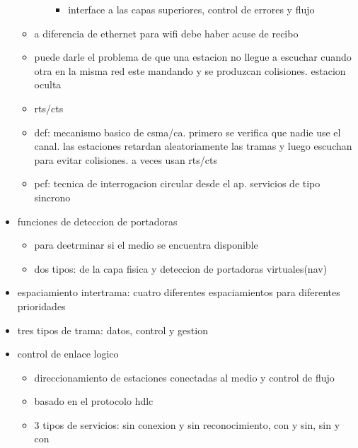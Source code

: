 \documentclass[11pt]{article}
\begin{document}
\begin{itemize}
\begin{itemize}
\begin{itemize}
\begin{itemize}
\item interface a las capas superiores, control de errores y flujo
\end{itemize}
\end{itemize}
\item a diferencia de ethernet para wifi debe haber acuse de recibo
\item puede darle el problema de que una estacion no llegue a escuchar cuando otra en la misma red este mandando y se produzcan colisiones. estacion oculta
\item rts/cts
\item dcf: mecanismo basico de csma/ca. primero se verifica que nadie use el canal. las estaciones retardan aleatoriamente las tramas y luego escuchan para evitar colisiones. a veces usan rts/cts
\item pcf: tecnica de interrogacion circular desde el ap. servicios de tipo sincrono
\end{itemize}
\item funciones de deteccion de portadoras
\begin{itemize}
\item para deetrminar si el medio se encuentra disponible
\item dos tipos: de la capa fisica y deteccion de portadoras virtuales(nav)
\end{itemize}
\item espaciamiento intertrama: cuatro diferentes espaciamientos para diferentes prioridades
\item tres tipos de trama: datos, control y gestion
\item control de enlace logico
\begin{itemize}
\item direccionamiento de estaciones conectadas al medio y control de flujo
\item basado en el protocolo hdlc
\item 3 tipos de servicios: sin conexion y sin reconocimiento, con y sin, sin y con
\end{itemize}
\end{itemize}
\end{document}
